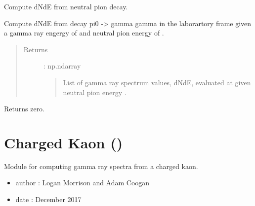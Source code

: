 \documentclass[letterpaper,10pt,english]{sphinxmanual}
\begin{document}
\begin{fulllineitems}
\label{\detokenize{modules:hazma.neutral_pion.decay_spectra}}
Compute dNdE from neutral pion decay.

Compute dNdE from decay pi0 -\textgreater{} gamma gamma in the laborartory frame given
a gamma ray engergy of  and neutral pion energy of .
\begin{quote}\begin{description}
\item[{Returns}] \leavevmode
{} : np.ndarray
\begin{quote}

List of gamma ray spectrum values, dNdE, evaluated at
 given neutral pion energy .
\end{quote}

\end{description}\end{quote}

\end{fulllineitems}


\begin{fulllineitems}
\label{\detokenize{modules:hazma.neutral_pion.fsr}}
Returns zero.

\end{fulllineitems}



\section{Charged Kaon ()}
\label{\detokenize{modules:module-hazma.charged_kaon}}\label{\detokenize{modules:charged-kaon-hazma-charged-kaon}}
Module for computing gamma ray spectra from a charged kaon.
\begin{itemize}
\item {} 
author : Logan Morrison and Adam Coogan

\item {} 
date : December 2017

\end{itemize}
\end{document}
